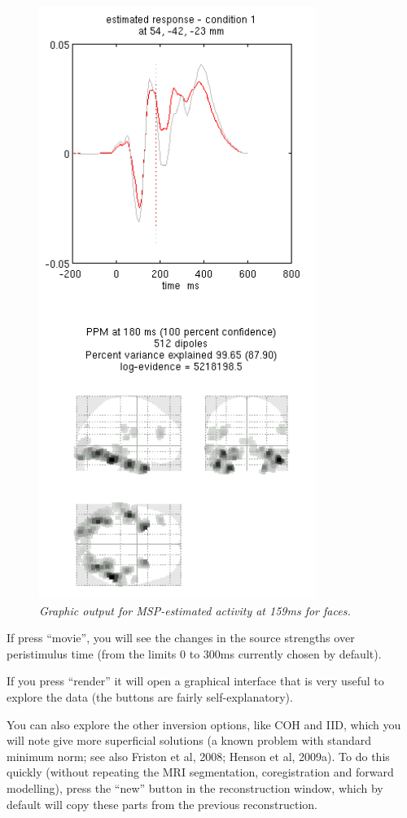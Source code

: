 \begin{figure}
\begin{center}
\includegraphics[width=90mm]{multimodal/figures/meg_msp.png}
\caption{\em  Graphic output for MSP-estimated activity at 159ms for faces.\label{multimodal:fig:18}}
\end{center}
\end{figure}


If press ``movie'', you will see the changes in the source strengths over peristimulus time (from the limits 0 to 300ms currently chosen by default).

If you press ``render'' it will open a graphical interface that is very useful to explore the data (the buttons are fairly self-explanatory). 

You can also explore the other inversion options, like COH and IID, which you will note give more superficial solutions (a known problem with standard minimum norm; see also Friston et al, 2008; Henson et al, 2009a). To do this quickly (without repeating the MRI segmentation, coregistration and forward modelling), press the ``new'' button in the reconstruction window, which by default will copy these parts from the previous reconstruction. 

